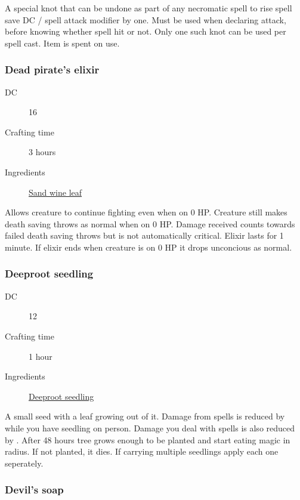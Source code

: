 A special knot that can be undone as part of any necromatic spell to rise spell save DC / spell attack modifier by one. Must be used when declaring attack, before knowing whether spell hit or not. Only one such knot can be used per spell cast. Item is spent on use.

\subsubsection{Dead pirate's elixir}
\label{Dead pirate's elixir}

\begin{description}
\item [DC] 16 \medicine
\item [Crafting time] 3 hours
\item [Ingredients] \hyperref[Sand vine]{Sand wine leaf}
\end{description}

Allows creature to continue fighting even when on 0 HP. Creature still makes death saving throws as normal when on 0 HP. Damage received counts
towards failed death saving throws but is not automatically critical.
Elixir lasts for 1 minute. If elixir ends when creature is on 0 HP it drops unconcious as normal.

\subsubsection{Deeproot seedling}
\label{Deeproot seedling}

\begin{description}
\item [DC] 12 \nature
\item [Crafting time] 1 hour
\item [Ingredients] \hyperref[Sussur]{Deeproot seedling}
\end{description}

A small seed with a leaf growing out of it. 
Damage from spells is reduced by  while you have seedling on person. 
Damage you deal with spells is also reduced by . 
After 48 hours tree grows enough to be planted and start eating magic in radius. 
If not planted, it dies. If carrying multiple seedlings apply each one seperately.

\subsubsection{Devil's soap}
\label{Devil's soap}

